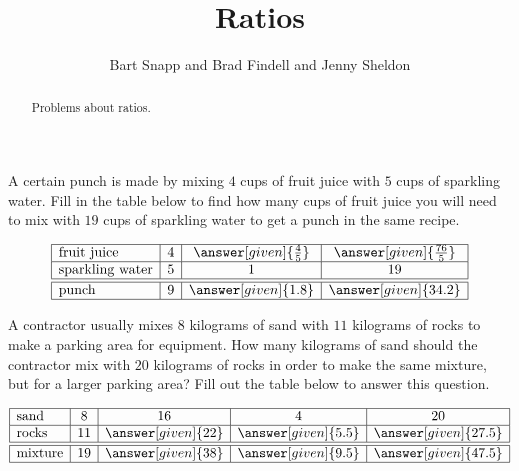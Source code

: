 \documentclass[nooutcomes]{ximera}
\title{Ratios}
\author{Bart Snapp and Brad Findell and Jenny Sheldon}
\begin{document}
\begin{abstract}
Problems about ratios.
\end{abstract}
\maketitle








\begin{problem}
A certain punch is made by mixing $4$ cups of fruit juice with $5$ cups of sparkling water.  Fill in the table below to find how many cups of fruit juice you will need to mix with $19$ cups of sparkling water to get a punch in the same recipe.

\[
\begin{array}{|l|c|c|c|} \hline
\textrm{fruit juice} & 4 & \answer[given]{\frac{4}{5}} & \answer[given]{\frac{76}{5}} \\ \hline
\textrm{sparkling water} &5 & 1 & 19 \\ \hline \hline
\textrm{punch} & 9 & \answer[given]{1.8} & \answer[given]{34.2} \\ \hline
\end{array}
\]
\end{problem}


\begin{problem}
A contractor usually mixes $8$ kilograms of sand with $11$ kilograms of rocks to make a parking area for equipment.  How many kilograms of sand should the contractor mix with $20$ kilograms of rocks in order to make the same mixture, but for a larger parking area?  Fill out the table below to answer this question.

\[
\begin{array}{|l|c|c|c|c|} \hline
\textrm{sand} & 8 & 16 & 4 & 20 \\ \hline
\textrm{rocks} & 11 & \answer[given]{22} & \answer[given]{5.5} & \answer[given]{27.5} \\ \hline \hline
\textrm{mixture} & 19 & \answer[given]{38} & \answer[given]{9.5} & \answer[given]{47.5} \\ \hline
\end{array}
\]
\end{problem}
\end{document}

